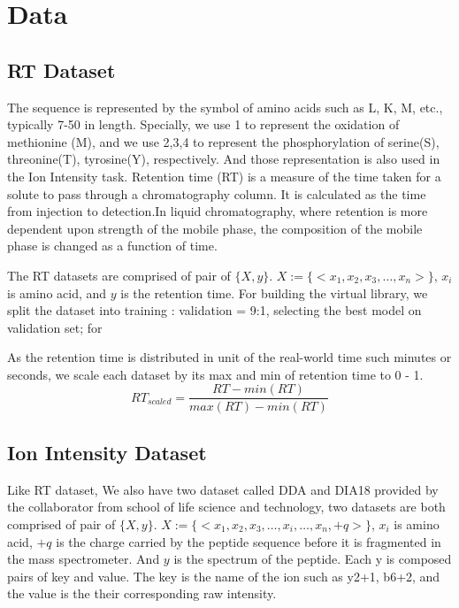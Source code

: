\documentclass[final]{cvpr}
\begin{document}

\section{Data}
\subsection{RT Dataset}
The sequence is represented by the symbol of amino acids such as L, K, M, etc., typically 7-50 
in length. Specially, we use 1 to represent the oxidation of methionine (M), and we use 2,3,4 to 
represent the phosphorylation of serine(S), threonine(T), tyrosine(Y), respectively. And those representation is also 
used in the Ion Intensity task.
Retention time (RT) is a measure of the time taken for a solute to pass through a chromatography column.
It is calculated as the time from injection to detection.In liquid chromatography, where retention is more dependent upon strength of the mobile phase, 
the composition of the mobile phase is changed as a function of time.

The RT datasets are comprised 
of pair of \( \{X, y\} \). $ X := \{ <x_1, x_2, x_3,\dots, x_n> \}$, $x_i$ is amino acid,
and \( y \) is the retention time. For building the virtual library, we split the dataset into training : validation = 9:1, selecting the best model on validation set; for 

As the retention time is distributed in unit of the real-world time such minutes or seconds, we scale each dataset by its max and min of retention time to 0 - 1.
\[RT_{scaled} = \frac{RT - min(RT)}{max(RT) - min(RT)}\] 

\subsection{Ion Intensity Dataset}
Like RT dataset, We also have two dataset called DDA and DIA18 provided by the collaborator from school of life science and technology, two datasets are both comprised 
of pair of \( \{X, y\} \). $ X := \{ <x_1, x_2, x_3,\dots, x_i, \dots, x_n, +q> \}$, $x_i$ is amino acid, $+q$ is the charge carried by the
peptide sequence before it is fragmented in the mass spectrometer. And \( y \) is the spectrum of the peptide. Each y is composed pairs of key and value.
The key is the name of the ion such as y2+1, b6+2, and the value is the their corresponding raw intensity.
\end{document}
